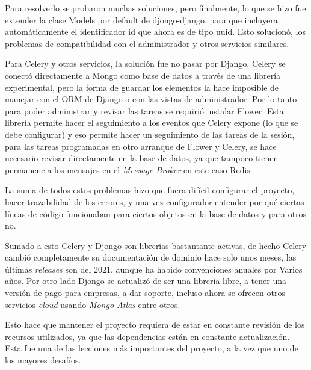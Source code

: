     \par Para resolverlo se probaron muchas soluciones, pero finalmente, lo que se hizo fue extender la clase Models por default de djongo-django, para que incluyera automáticamente el identificador id que ahora es de tipo uuid. Esto solucionó, los problemas de compatibilidad con el administrador y otros servicios similares.
    
    \par Para \gls{Celery} y otros servicios, la solución fue no pasar por \gls{Django}, \gls{Celery} se conectó directamente a Mongo como base de datos a través de una librería experimental, pero la forma de guardar los elementos la hace imposible de manejar con el \acrshort{ORM} de \gls{Django} o con las vistas de administrador. Por lo tanto para poder administrar y revisar las tareas se requirió instalar \gls{Flower}. Esta librería permite hacer el seguimiento a los eventos que \gls{Celery} expone (lo que se debe configurar) y eso permite hacer un seguimiento de las tareas de la sesión, para las tareas programadas en otro arranque de \gls{Flower} y \gls{Celery}, se hace necesario revisar directamente en la base de datos, ya que tampoco tienen permanencia los mensajes en el \textit{Message Broker} en este caso \gls{Redis}.
    
    \par La suma de todos estos problemas hizo que fuera difícil configurar el proyecto, hacer trazabilidad de los errores, y una vez configurador entender por qué ciertas líneas de código funcionaban para ciertos objetos en la base de datos y para otros no.
    
    \par Sumado a esto \gls{Celery} y \gls{Djongo} son librerías bastantante activas, de hecho \gls{Celery} cambió completamente su documentación de dominio hace solo unos meses, las últimas \textit{releases} son del 2021, aunque ha habido convenciones anuales por Varios años. Por otro lado \gls{Djongo} se actualizó de ser una librería libre, a tener una versión de pago para empresas, a dar soporte, incluso ahora se ofrecen otros servicios \textit{cloud} usando \textit{Mongo Atlas} entre otros.
    
    \par Esto hace que mantener el proyecto requiera de estar en constante revisión de los recursos utilizados, ya que las dependencias están en constante actualización. Esta fue una de las lecciones más importantes del proyecto, a la vez que uno de los mayores desafíos.

